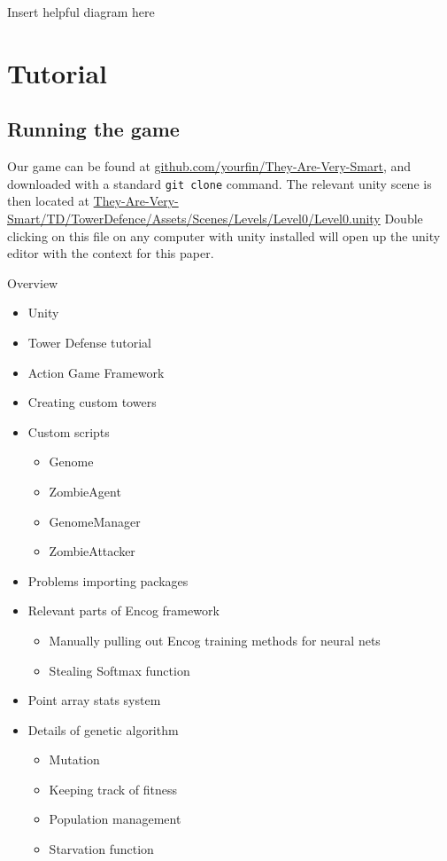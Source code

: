 \documentclass[letterpaper]{article}
\begin{document}
Insert helpful diagram here




\section{Tutorial}

\subsection{Running the game}
Our game can be found at
\href{https://github.com/YourFin/They-Are-Very-Smart}{github.com/yourfin/They-Are-Very-Smart},
and downloaded with a standard \texttt{git clone} command. The relevant unity
scene is then located at
\url{They-Are-Very-Smart/TD/TowerDefence/Assets/Scenes/Levels/Level0/Level0.unity}
Double clicking on this file on any computer with unity installed will open up
the unity editor with the context for this paper.

Overview
\begin{itemize}
    \item Unity
    \item Tower Defense tutorial
    \item Action Game Framework
    \item Creating custom towers
    \item Custom scripts
        \begin{itemize}
            \item Genome
            \item ZombieAgent
            \item GenomeManager
            \item ZombieAttacker
        \end{itemize}
    \item Problems importing packages
    \item Relevant parts of Encog framework
        \begin{itemize}
            \item Manually pulling out Encog training methods for neural nets
            \item Stealing Softmax function
        \end{itemize}
    \item Point array stats system
    \item Details of genetic algorithm
        \begin{itemize}
            \item Mutation
            \item Keeping track of fitness
            \item Population management
            \item Starvation function
        \end{itemize}
\end{itemize}
\end{document}

